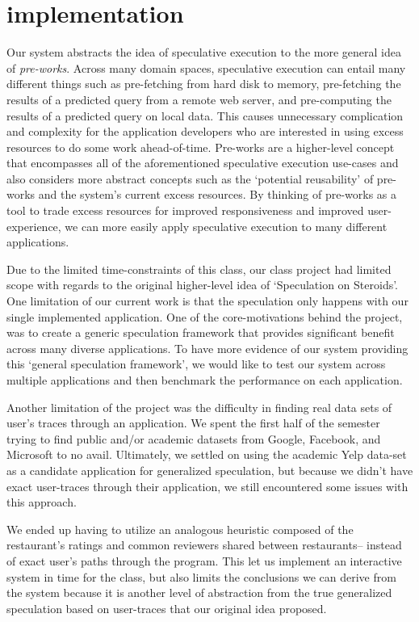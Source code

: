 \section{implementation}
\label{sec:impl}
Our system abstracts the idea of speculative execution to the more general idea
of {\it pre-works}. Across many domain spaces, speculative execution can entail many
different things such as pre-fetching from hard disk to memory, pre-fetching
the results of a predicted query from a remote web server, and pre-computing
the results of a predicted query on local data. This causes unnecessary
complication and complexity for the application developers who are interested in
using excess resources to do some work ahead-of-time. Pre-works are a
higher-level concept that encompasses all of the aforementioned speculative
execution use-cases and also considers more abstract concepts such as the
`potential reusability' of pre-works and the system's current excess
resources. By thinking of pre-works as a tool to trade excess resources for
improved responsiveness and improved user-experience, we can more easily apply
speculative execution to many different applications.

Due to the limited time-constraints of this class, our class project had
limited scope with regards to the original higher-level idea of `Speculation
on Steroids'. One limitation of our current work is that the speculation only
happens with our single implemented application. One of the core-motivations
behind the project, was to create a generic speculation framework that
provides significant benefit across many diverse applications. To have more
evidence of our system providing this `general speculation framework', we
would like to test our system across multiple applications and then benchmark
the performance on each application. 

Another limitation of the project was the difficulty in finding real data sets
of user’s traces through an application. We spent the first half of the
semester trying to find public and/or academic datasets from Google, Facebook,
and Microsoft to no avail. Ultimately, we settled on using the academic Yelp
data-set as a candidate application for generalized speculation, but because
we didn’t have exact user-traces through their application, we still
encountered some issues with this approach. 

We ended up having to utilize an analogous heuristic composed of the
restaurant’s ratings and common reviewers shared between restaurants-- instead
of exact user’s paths through the program. This let us implement an interactive
system in time for the class, but also limits the conclusions we can derive from
the system because it is another level of abstraction from the true generalized
speculation based on user-traces that our original idea proposed.


